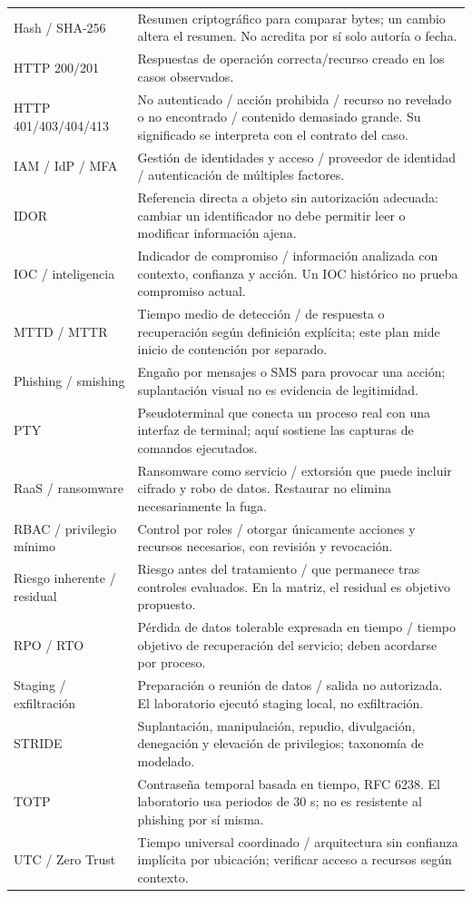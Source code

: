 \documentclass[10pt,a4paper]{article}
\begin{document}
\begin{TablaCompacta}
\begin{longtable}{P{35mm}P{124mm}}
Hash / SHA-256 & Resumen criptográfico para comparar bytes; un cambio altera el resumen. No acredita por sí solo autoría o fecha.\\
HTTP 200/201 & Respuestas de operación correcta/recurso creado en los casos observados.\\
HTTP 401/403/404/413 & No autenticado / acción prohibida / recurso no revelado o no encontrado / contenido demasiado grande. Su significado se interpreta con el contrato del caso.\\
IAM / IdP / MFA & Gestión de identidades y acceso / proveedor de identidad / autenticación de múltiples factores.\\
IDOR & Referencia directa a objeto sin autorización adecuada: cambiar un identificador no debe permitir leer o modificar información ajena.\\
IOC / inteligencia & Indicador de compromiso / información analizada con contexto, confianza y acción. Un IOC histórico no prueba compromiso actual.\\
MTTD / MTTR & Tiempo medio de detección / de respuesta o recuperación según definición explícita; este plan mide inicio de contención por separado.\\
Phishing / smishing & Engaño por mensajes o SMS para provocar una acción; suplantación visual no es evidencia de legitimidad.\\
PTY & Pseudoterminal que conecta un proceso real con una interfaz de terminal; aquí sostiene las capturas de comandos ejecutados.\\
RaaS / ransomware & Ransomware como servicio / extorsión que puede incluir cifrado y robo de datos. Restaurar no elimina necesariamente la fuga.\\
RBAC / privilegio mínimo & Control por roles / otorgar únicamente acciones y recursos necesarios, con revisión y revocación.\\
Riesgo inherente / residual & Riesgo antes del tratamiento / que permanece tras controles evaluados. En la matriz, el residual es objetivo propuesto.\\
RPO / RTO & Pérdida de datos tolerable expresada en tiempo / tiempo objetivo de recuperación del servicio; deben acordarse por proceso.\\
Staging / exfiltración & Preparación o reunión de datos / salida no autorizada. El laboratorio ejecutó staging local, no exfiltración.\\
STRIDE & Suplantación, manipulación, repudio, divulgación, denegación y elevación de privilegios; taxonomía de modelado.\\
TOTP & Contraseña temporal basada en tiempo, RFC 6238. El laboratorio usa periodos de 30 s; no es resistente al phishing por sí misma.\\
UTC / Zero Trust & Tiempo universal coordinado / arquitectura sin confianza implícita por ubicación; verificar acceso a recursos según contexto.\\\bottomrule
\end{longtable}
\end{TablaCompacta}
\end{document}
